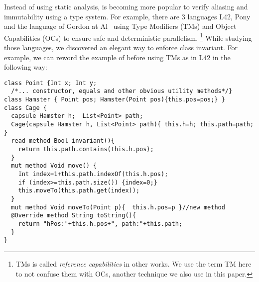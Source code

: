 Instead of using static analysis, 
is becoming more popular to verify aliasing and immutability using a type system.
For example, there are 3 languages L42, Pony and the language of Gordon at Al~\cite{}
using Type Modifiers (TMs) and Object Capabilities (OCs) to ensure safe and deterministic parallelism.%
\footnote{TMs is called \emph{reference capabilities} in other works. We use the term TM here
to not confuse them with OCs, another technique we also use in this paper.}
While studying those languages, we discovered an elegant way to enforce class invariant.
For example, we can reword the example of before using TMs as in L42 in the following way:
\begin{lstlisting}
class Point {Int x; Int y;
  /*... constructor, equals and other obvious utility methods*/}
class Hamster { Point pos; Hamster(Point pos){this.pos=pos;} }
class Cage {
  capsule Hamster h;  List<Point> path;
  Cage(capsule Hamster h, List<Point> path){ this.h=h; this.path=path; }
  read method Bool invariant(){
    return this.path.contains(this.h.pos);
  }
  mut method Void move() {
    Int index=1+this.path.indexOf(this.h.pos);
    if (index>=this.path.size()) {index=0;}
    this.moveTo(this.path.get(index));
  }
  mut method Void moveTo(Point p){  this.h.pos=p }//new method
  @Override method String toString(){
    return "hPos:"+this.h.pos+", path:"+this.path;
  }
}
\end{lstlisting}



